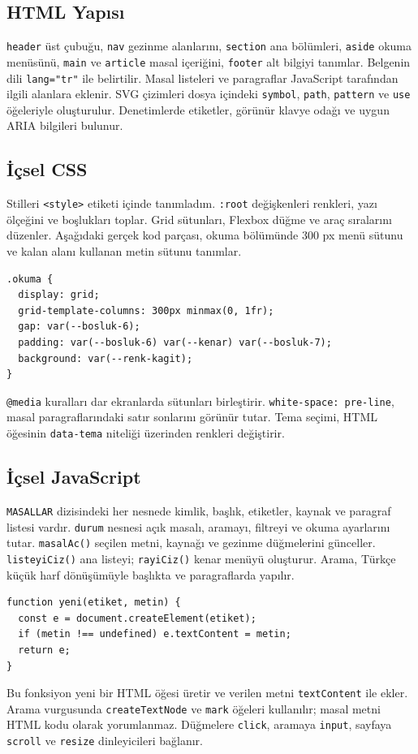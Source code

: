 \documentclass[12pt,a4paper]{article}
\begin{document}
\subsection{HTML Yapısı}
\texttt{header} üst çubuğu, \texttt{nav} gezinme alanlarını, \texttt{section} ana bölümleri, \texttt{aside} okuma menüsünü, \texttt{main} ve \texttt{article} masal içeriğini, \texttt{footer} alt bilgiyi tanımlar. Belgenin dili \texttt{lang="tr"} ile belirtilir. Masal listeleri ve paragraflar JavaScript tarafından ilgili alanlara eklenir. SVG çizimleri dosya içindeki \texttt{symbol}, \texttt{path}, \texttt{pattern} ve \texttt{use} öğeleriyle oluşturulur. Denetimlerde etiketler, görünür klavye odağı ve uygun ARIA bilgileri bulunur.

\subsection{İçsel CSS}
Stilleri \texttt{<style>} etiketi içinde tanımladım. \texttt{:root} değişkenleri renkleri, yazı ölçeğini ve boşlukları toplar. Grid sütunları, Flexbox düğme ve araç sıralarını düzenler. Aşağıdaki gerçek kod parçası, okuma bölümünde 300 px menü sütunu ve kalan alanı kullanan metin sütunu tanımlar.
\begin{lstlisting}[float=htbp,caption={Okuma bölümünün sütun düzeni}]
.okuma {
  display: grid;
  grid-template-columns: 300px minmax(0, 1fr);
  gap: var(--bosluk-6);
  padding: var(--bosluk-6) var(--kenar) var(--bosluk-7);
  background: var(--renk-kagit);
}
\end{lstlisting}
\texttt{@media} kuralları dar ekranlarda sütunları birleştirir. \texttt{white-space: pre-line}, masal paragraflarındaki satır sonlarını görünür tutar. Tema seçimi, HTML öğesinin \texttt{data-tema} niteliği üzerinden renkleri değiştirir.

\subsection{İçsel JavaScript}
\texttt{MASALLAR} dizisindeki her nesnede kimlik, başlık, etiketler, kaynak ve paragraf listesi vardır. \texttt{durum} nesnesi açık masalı, aramayı, filtreyi ve okuma ayarlarını tutar. \texttt{masalAc()} seçilen metni, kaynağı ve gezinme düğmelerini günceller. \texttt{listeyiCiz()} ana listeyi; \texttt{rayiCiz()} kenar menüyü oluşturur. Arama, Türkçe küçük harf dönüşümüyle başlıkta ve paragraflarda yapılır.
\begin{lstlisting}[float=htbp,caption={Metin öğesi oluşturan yardımcı fonksiyon}]
function yeni(etiket, metin) {
  const e = document.createElement(etiket);
  if (metin !== undefined) e.textContent = metin;
  return e;
}
\end{lstlisting}
Bu fonksiyon yeni bir HTML öğesi üretir ve verilen metni \texttt{textContent} ile ekler. Arama vurgusunda \texttt{createTextNode} ve \texttt{mark} öğeleri kullanılır; masal metni HTML kodu olarak yorumlanmaz. Düğmelere \texttt{click}, aramaya \texttt{input}, sayfaya \texttt{scroll} ve \texttt{resize} dinleyicileri bağlanır.
\end{document}
